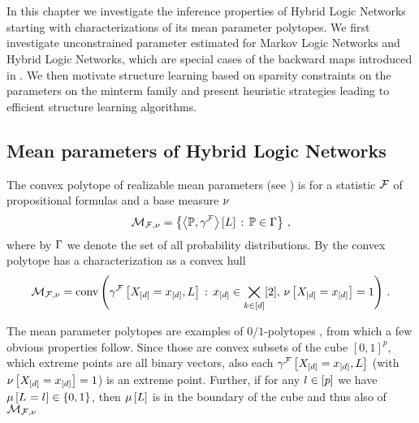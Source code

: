 \section{\chatextnetworkReasoning}\label{cha:networkReasoning}

In this chapter we investigate the inference properties of Hybrid Logic Networks starting with characterizations of its mean parameter polytopes.
We first investigate unconstrained parameter estimated for Markov Logic Networks and Hybrid Logic Networks, which are special cases of the backward maps introduced in .
We then motivate structure learning based on sparsity constraints on the parameters on the minterm family and present heuristic strategies leading to efficient structure learning algorithms.

\subsection{Mean parameters of Hybrid Logic Networks}

The convex polytope of realizable mean parameters (see ) is for a statistic $\mathcal{F}$ of propositional formulas and a base measure $\nu$
	\[ \mathcal{M}_{\mathcal{F},\nu} = \left\{ \left\langle \mathbb{P},\gamma^{\mathcal{F}}\right\rangle \left[ L \right] \, : \, \mathbb{P}\in\Gamma \right\} \, ,\]
where by $\Gamma$ we denote the set of all probability distributions.
By  the convex polytope has a characterization as a convex hull
\begin{align}\label{eq:hlnMeansetConvCharacterization}
	\mathcal{M}_{\mathcal{F},\nu}
	= \mathrm{conv}\left(\gamma^{\mathcal{F}}\left[X_{[d]}=x_{[d]},L\right] \, : \, x_{[d]}\in\bigtimes_{k\in[d]}[2], \, \nu\left[X_{[d]}=x_{[d]}\right]=1\right) \, . 
\end{align}

The mean parameter polytopes are examples of $0/1$-polytopes \cite{ziegler_lectures_2000,gillmann_01-polytopes_2007}, from which a few obvious properties follow.
Since those are convex subsets of the cube $[0,1]^p$, which extreme points are all binary vectors, also each $\gamma^{\mathcal{F}}\left[X_{[d]}=x_{[d]},L\right]$ (with $\nu\left[X_{[d]}=x_{[d]}\right]=1$) is an extreme point.
Further, if for any $l\in[p]$ we have $\mu\left[L_{}=l_{}\right]\in\{0,1\}$, then $\mu\left[L\right]$ is in the boundary of the cube and thus also of $\mathcal{M}_{\mathcal{F},\nu}$

